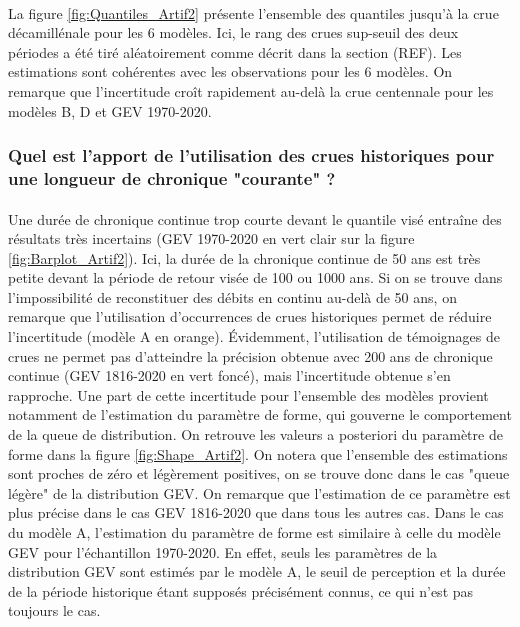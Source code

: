 \documentclass[11pt]{article}
\begin{document}
	\paragraph{} La figure \ref{fig:Quantiles_Artif2} présente l'ensemble des quantiles jusqu'à la crue décamillénale pour les 6 modèles. Ici, le rang des crues sup-seuil des deux périodes a été tiré aléatoirement comme décrit dans la section (REF). Les estimations sont cohérentes avec les observations pour les 6 modèles. On remarque que l'incertitude croît rapidement au-delà la crue centennale pour les modèles B, D et GEV 1970-2020. 

\FloatBarrier
	
	\subsubsection{Quel est l'apport de l'utilisation des crues historiques pour une longueur de chronique "courante" ?}
	
	\paragraph{} Une durée de chronique continue trop courte devant le quantile visé entraîne des résultats très incertains (GEV 1970-2020 en vert clair sur la figure \ref{fig:Barplot_Artif2}). Ici, la durée de la chronique continue de 50 ans est très petite devant la période de retour visée de 100 ou 1000 ans. Si on se trouve dans l'impossibilité de reconstituer des débits en continu au-delà de 50 ans, on remarque que l'utilisation d'occurrences de crues historiques permet de réduire l'incertitude (modèle A en orange). Évidemment, l'utilisation de témoignages de crues ne permet pas d'atteindre la précision obtenue avec 200 ans de chronique continue (GEV 1816-2020 en vert foncé), mais l'incertitude obtenue s'en rapproche. Une part de cette incertitude pour l'ensemble des modèles provient notamment de l'estimation du paramètre de forme, qui gouverne le comportement de la queue de distribution. On retrouve les valeurs a posteriori du paramètre de forme dans la figure \ref{fig:Shape_Artif2}. On notera que l'ensemble des estimations sont proches de zéro et légèrement positives, on se trouve donc dans le cas "queue légère" de la distribution GEV. On remarque que l'estimation de ce paramètre est plus précise dans le cas GEV 1816-2020 que dans tous les autres cas. Dans le cas du modèle A, l'estimation du paramètre de forme est similaire à celle du modèle GEV pour l'échantillon 1970-2020. En effet, seuls les paramètres de la distribution GEV sont estimés par le modèle A, le seuil de perception et la durée de la période historique étant supposés précisément connus, ce qui n'est pas toujours le cas. 
	
\end{document}
